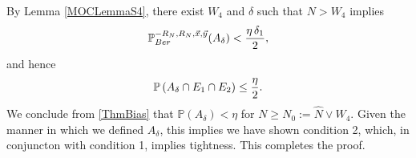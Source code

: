 	By Lemma \ref{MOCLemmaS4}, there exist $W_4$ and $\delta$ such that $N>W_4$ implies
	\[
	\mathbb{P}_{Ber}^{-R_N,R_N,\vec x,\vec y}(A_\delta)<\frac{\eta\,\delta_1}2,
	\] 
	and hence $$\mathbb{P}\left(A_\delta\cap E_1\cap E_2\right)\leq \frac{\eta}{2}.$$ We conclude from \eqref{ThmBias} that $\mathbb{P}(A_\delta) < \eta$ for $N\geq N_0 := \hat N \vee W_4$. Given the manner in which we defined $A_\delta$, this implies we have shown condition 2, which, in conjuncton with condition 1, implies tightness. This completes the proof.

